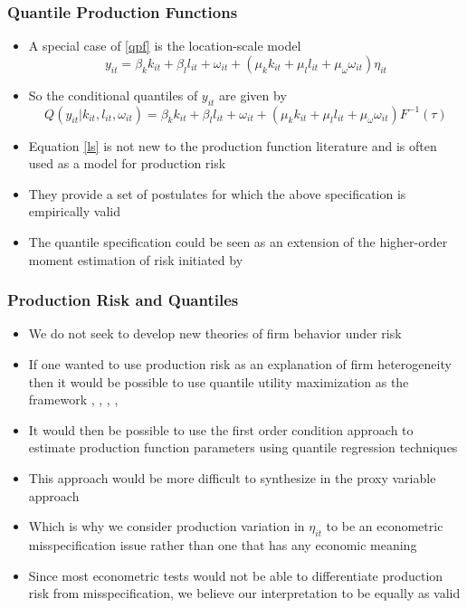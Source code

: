 \documentclass{beamer}
\begin{document}

\begin{frame}
\frametitle{Quantile Production Functions}
\begin{itemize}
	\item A special case of \eqref{qpf} is the location-scale model
	\begin{equation} \label{ls}
	y_{it}=\beta_{k}k_{it}+\beta_{l}l_{it}+\omega_{it}+(\mu_{k}k_{it}+\mu_{l}l_{it}+\mu_{\omega}\omega_{it})\eta_{it}
	\end{equation}
	\item So the conditional quantiles of $y_{it}$ are given by
	\begin{equation}
	Q(y_{it}|k_{it}, l_{it}, \omega_{it})=\beta_{k}k_{it}+\beta_{l}l_{it}+\omega_{it}+(\mu_{k}k_{it}+\mu_{l}l_{it}+\mu_{\omega}\omega_{it})F^{-1}(\tau)
	\end{equation}
	\item Equation \eqref{ls} is not new to the production function literature and is often used as a model for production risk \parencite{Just1978}
	\item They provide a set of postulates for which the above specification is empirically valid
	\item The quantile specification could be seen as an extension of the higher-order moment estimation of risk initiated by \textcite{Antle1983}
\end{itemize}
\end{frame}


\begin{frame}
\frametitle{Production Risk and Quantiles}
\begin{itemize}
	\item We do not seek to develop new theories of firm behavior under risk
	\item If one wanted to use production risk as an explanation of firm heterogeneity then it would be possible to use quantile utility maximization as the framework \parencite{Manski1988}, \parencite{Bhattacharya2009}, \parencite{ROSTEK2009}, \parencite{Chambers2007}, \parencite{Castro2017}
	\item It would then be possible to use the first order condition approach to estimate production function parameters using quantile regression techniques
	\item This approach would be more difficult to synthesize in the proxy variable approach
	\item Which is why we consider production variation in $\eta_{it}$ to be an econometric misspecification issue rather than one that has any economic meaning
	\item Since most econometric tests would not be able to differentiate production risk from misspecification, we believe our interpretation to be equally as valid
\end{itemize}
\end{frame}
\end{document}
